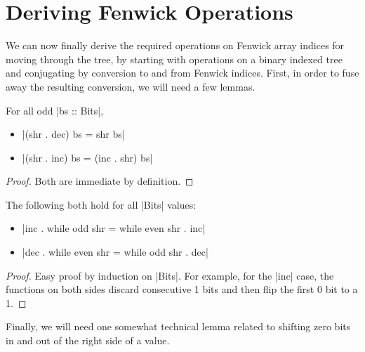 \section{Deriving Fenwick Operations} \label{sec:fenwick-ops}

We can now finally derive the required operations on Fenwick array
indices for moving through the tree, by starting with operations on a
binary indexed tree and conjugating by conversion to and from Fenwick
indices.  First, in order to fuse away the resulting conversion, we
will need a few lemmas.

\begin{lem} \label{lem:incshr}
  For all odd |bs :: Bits|,
  \begin{itemize}
  \item |(shr . dec) bs = shr bs|
  \item |(shr . inc) bs = (inc . shr) bs|
  \end{itemize}
\end{lem}
\begin{proof}
  Both are immediate by definition.
\end{proof}

\begin{lem} \label{lem:incwhile}
  The following both hold for all |Bits| values:
  \begin{itemize}
  \item |inc . while odd shr = while even shr . inc|
  \item |dec . while even shr = while odd shr . dec|
  \end{itemize}
\end{lem}
\begin{proof}
  Easy proof by induction on |Bits|.  For example, for the |inc| case,
  the functions on both sides discard consecutive 1 bits and then flip
  the first 0 bit to a 1.
\end{proof}

Finally, we will need one somewhat technical lemma related to shifting
zero bits in and out of the right side of a value.

